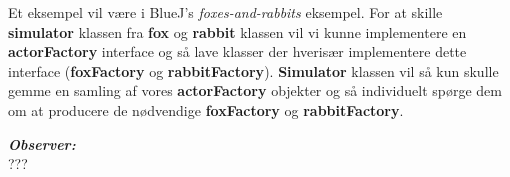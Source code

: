 \documentclass[a4paper,12pt]{article}
\newcommand{\textbfit}[1]{\textbf{\textit{#1}}}
\begin{document}
Et eksempel vil være i BlueJ's \textit{foxes-and-rabbits} eksempel. For at skille \textbf{simulator} klassen fra \textbf{fox} og \textbf{rabbit} klassen vil vi kunne implementere en \textbf{actorFactory} interface og så lave klasser der hverisær implementere dette interface (\textbf{foxFactory} og \textbf{rabbitFactory}). \textbf{Simulator} klassen vil så kun skulle gemme en samling af vores  \textbf{actorFactory} objekter og så individuelt spørge dem om at producere de nødvendige \textbf{foxFactory} og \textbf{rabbitFactory}.


\textbfit{Observer:} \\
???
\end{document}
